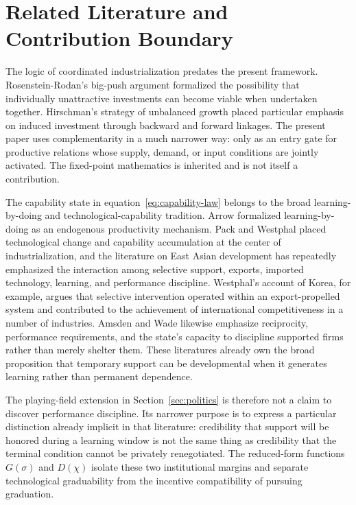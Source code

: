\section{Related Literature and Contribution Boundary}
\label{sec:literature}

The logic of coordinated industrialization predates the present framework. Rosenstein-Rodan's big-push argument formalized the possibility that individually unattractive investments can become viable when undertaken together. Hirschman's strategy of unbalanced growth placed particular emphasis on induced investment through backward and forward linkages. The present paper uses complementarity in a much narrower way: only as an entry gate for productive relations whose supply, demand, or input conditions are jointly activated. The fixed-point mathematics is inherited and is not itself a contribution.

The capability state in equation~\eqref{eq:capability-law} belongs to the broad learning-by-doing and technological-capability tradition. Arrow formalized learning-by-doing as an endogenous productivity mechanism. Pack and Westphal placed technological change and capability accumulation at the center of industrialization, and the literature on East Asian development has repeatedly emphasized the interaction among selective support, exports, imported technology, learning, and performance discipline. Westphal's account of Korea, for example, argues that selective intervention operated within an export-propelled system and contributed to the achievement of international competitiveness in a number of industries. Amsden and Wade likewise emphasize reciprocity, performance requirements, and the state's capacity to discipline supported firms rather than merely shelter them. These literatures already own the broad proposition that temporary support can be developmental when it generates learning rather than permanent dependence.

The playing-field extension in Section~\ref{sec:politics} is therefore not a claim to discover performance discipline. Its narrower purpose is to express a particular distinction already implicit in that literature: credibility that support will be honored during a learning window is not the same thing as credibility that the terminal condition cannot be privately renegotiated. The reduced-form functions $G(\sigma)$ and $D(\chi)$ isolate these two institutional margins and separate technological graduability from the incentive compatibility of pursuing graduation.


